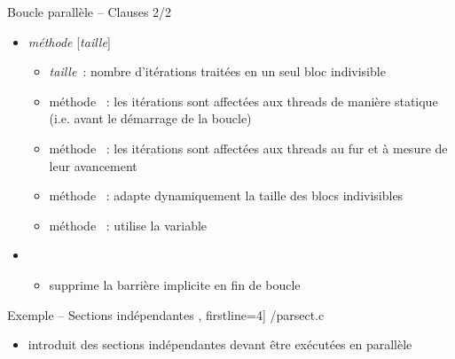 \begin {frame} {Boucle parallèle -- Clauses 2/2}
    \begin {itemize}

	\item {}\emph {méthode}
	    [\code {,}\emph {taille\/}]\code {)}

	    \begin {itemize}
		\item \emph {taille}~: nombre d'itérations traitées
		    en un seul bloc indivisible

		\item méthode ~: les itérations sont
		    affectées aux threads de manière statique
		    (i.e. avant le démarrage de la boucle)

		\item méthode ~: les itérations sont
		    affectées aux threads au fur et à mesure de leur
		    avancement

		\item méthode ~: adapte dynamiquement
		    la taille des blocs indivisibles

		\item méthode ~: utilise la variable

	    \end {itemize}

	\item {}

	    \begin {itemize}
		\item supprime la barrière implicite en fin de boucle

	    \end {itemize}

    \end {itemize}
    
\end {frame}


\begin {frame} [fragile] {Exemple \theompexemple{} -- Sections indépendantes}
    \scriptsize\lstmonstyle, firstline=4] {\inc/parsect.c}

    \begin {itemize}
	\item {}
	    introduit des sections indépendantes devant être exécutées
	    en parallèle

    \end {itemize}
\end{frame}

